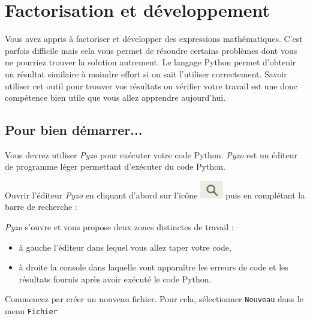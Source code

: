 \chapter{Factorisation et développement}

Vous avez appris à factoriser et développer des expressions mathématiques. C'est parfois difficile mais cela vous permet de résoudre certains problèmes dont vous ne pourriez trouver la solution autrement. Le langage Python permet d'obtenir un résultat similaire à moindre effort si on sait l'utiliser correctement. Savoir utiliser cet outil pour trouver vos résultats ou vérifier votre travail est une donc compétence bien utile que vous allez apprendre aujourd'hui.\\

\section{Pour bien démarrer...}

Vous devrez utiliser \emph{Pyzo} pour exécuter votre code Python. \emph{Pyzo} est un éditeur de programme léger permettant d'exécuter du code Python. 

Ouvrir l'éditeur \emph{Pyzo} en cliquant d'abord sur l'icône \includegraphics[width=1cm]{./images/activite7/icone_recherche} puis en complétant la barre de recherche : 


\emph{Pyzo} s'ouvre et vous propose deux zones distinctes de travail :
\begin{itemize}
\item à gauche l'éditeur dans lequel vous allez taper votre code,
\item à droite la console dans laquelle vont apparaître les erreurs de code et les résultats fournis après avoir exécuté le code Python.
\end{itemize}




Commencez par créer un nouveau fichier. Pour cela, sélectionner \texttt{Nouveau} dans le menu \texttt{Fichier}


